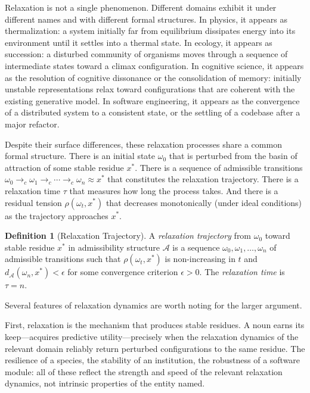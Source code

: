 \documentclass[12pt, a4paper]{article}
\theoremstyle{plain}
\theoremstyle{definition}
\newtheorem{definition}[theorem]{Definition}
\theoremstyle{remark}
\begin{document}
Relaxation is not a single phenomenon. Different domains exhibit it under
different names and with different formal structures. In physics, it appears
as thermalization: a system initially far from equilibrium dissipates energy
into its environment until it settles into a thermal state. In ecology, it
appears as succession: a disturbed community of organisms moves through a
sequence of intermediate states toward a climax configuration. In cognitive
science, it appears as the resolution of cognitive dissonance or the
consolidation of memory: initially unstable representations relax toward
configurations that are coherent with the existing generative model. In
software engineering, it appears as the convergence of a distributed system
to a consistent state, or the settling of a codebase after a major refactor.

Despite their surface differences, these relaxation processes share a common
formal structure. There is an initial state $\omega_0$ that is perturbed
from the basin of attraction of some stable residue $x^*$. There is a
sequence of admissible transitions $\omega_0 \to_c \omega_1 \to_c \cdots
\to_c \omega_n \approx x^*$ that constitutes the relaxation trajectory.
There is a relaxation time $\tau$ that measures how long the process takes.
And there is a residual tension $\rho(\omega_t, x^*)$ that decreases
monotonically (under ideal conditions) as the trajectory approaches $x^*$.

\begin{definition}[Relaxation Trajectory]
A \emph{relaxation trajectory} from $\omega_0$ toward stable residue $x^*$
in admissibility structure $\mathcal{A}$ is a sequence
$\omega_0, \omega_1, \ldots, \omega_n$ of admissible transitions such that
$\rho(\omega_t, x^*)$ is non-increasing in $t$ and
$d_{\mathcal{A}}(\omega_n, x^*) < \epsilon$ for some convergence criterion
$\epsilon > 0$. The \emph{relaxation time} is $\tau = n$.
\end{definition}

Several features of relaxation dynamics are worth noting for the larger
argument.

First, relaxation is the mechanism that produces stable residues. A noun
earns its keep---acquires predictive utility---precisely when the relaxation
dynamics of the relevant domain reliably return perturbed configurations to
the same residue. The resilience of a species, the stability of an institution,
the robustness of a software module: all of these reflect the strength and
speed of the relevant relaxation dynamics, not intrinsic properties of the
entity named.
\end{document}
